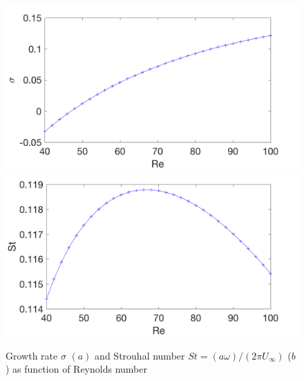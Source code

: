 \documentclass[twocolumn,10pt]{asme2ej}
\begin{document}





\begin{figure}
\includegraphics[width=.9 \linewidth]{Cylinder_Sigma_Re.png}
\includegraphics[width=.9 \linewidth]{Cylinder_Strouhal_Re.png}
\caption{Growth rate $\sigma$ $(a)$  and Strouhal number $St = (a \omega)/(2\pi U_{\infty})$ ($b$) as function of Reynolds number}
\label{fig:SigmaOmega}
\end{figure}
\end{document}
